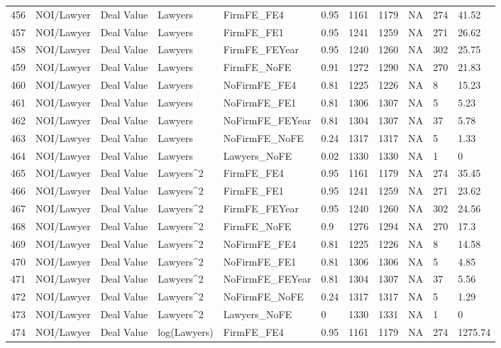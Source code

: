 \documentclass{article}
\begin{document}
\begin{table}[H]
\begin{tabular}{rllllllllll}
  456 & NOI/Lawyer & Deal Value & Lawyers & FirmFE\_FE4 & 0.95 & 1161 & 1179 & NA & 274 & 41.52 \\ 
  457 & NOI/Lawyer & Deal Value & Lawyers & FirmFE\_FE1 & 0.95 & 1241 & 1259 & NA & 271 & 26.62 \\ 
  458 & NOI/Lawyer & Deal Value & Lawyers & FirmFE\_FEYear & 0.95 & 1240 & 1260 & NA & 302 & 25.75 \\ 
  459 & NOI/Lawyer & Deal Value & Lawyers & FirmFE\_NoFE & 0.91 & 1272 & 1290 & NA & 270 & 21.83 \\ 
  460 & NOI/Lawyer & Deal Value & Lawyers & NoFirmFE\_FE4 & 0.81 & 1225 & 1226 & NA & 8 & 15.23 \\ 
  461 & NOI/Lawyer & Deal Value & Lawyers & NoFirmFE\_FE1 & 0.81 & 1306 & 1307 & NA & 5 & 5.23 \\ 
  462 & NOI/Lawyer & Deal Value & Lawyers & NoFirmFE\_FEYear & 0.81 & 1304 & 1307 & NA & 37 & 5.78 \\ 
  463 & NOI/Lawyer & Deal Value & Lawyers & NoFirmFE\_NoFE & 0.24 & 1317 & 1317 & NA & 5 & 1.33 \\ 
  464 & NOI/Lawyer & Deal Value & Lawyers & Lawyers\_NoFE & 0.02 & 1330 & 1330 & NA & 1 & 0 \\ 
  465 & NOI/Lawyer & Deal Value & Lawyers^2 & FirmFE\_FE4 & 0.95 & 1161 & 1179 & NA & 274 & 35.45 \\ 
  466 & NOI/Lawyer & Deal Value & Lawyers^2 & FirmFE\_FE1 & 0.95 & 1241 & 1259 & NA & 271 & 23.62 \\ 
  467 & NOI/Lawyer & Deal Value & Lawyers^2 & FirmFE\_FEYear & 0.95 & 1240 & 1260 & NA & 302 & 24.56 \\ 
  468 & NOI/Lawyer & Deal Value & Lawyers^2 & FirmFE\_NoFE & 0.9 & 1276 & 1294 & NA & 270 & 17.3 \\ 
  469 & NOI/Lawyer & Deal Value & Lawyers^2 & NoFirmFE\_FE4 & 0.81 & 1225 & 1226 & NA & 8 & 14.58 \\ 
  470 & NOI/Lawyer & Deal Value & Lawyers^2 & NoFirmFE\_FE1 & 0.81 & 1306 & 1306 & NA & 5 & 4.85 \\ 
  471 & NOI/Lawyer & Deal Value & Lawyers^2 & NoFirmFE\_FEYear & 0.81 & 1304 & 1307 & NA & 37 & 5.56 \\ 
  472 & NOI/Lawyer & Deal Value & Lawyers^2 & NoFirmFE\_NoFE & 0.24 & 1317 & 1317 & NA & 5 & 1.29 \\ 
  473 & NOI/Lawyer & Deal Value & Lawyers^2 & Lawyers\_NoFE & 0 & 1330 & 1331 & NA & 1 & 0 \\ 
  474 & NOI/Lawyer & Deal Value & log(Lawyers) & FirmFE\_FE4 & 0.95 & 1161 & 1179 & NA & 274 & 1275.74 \\ 

\end{tabular}
\end{table}
\end{document}
